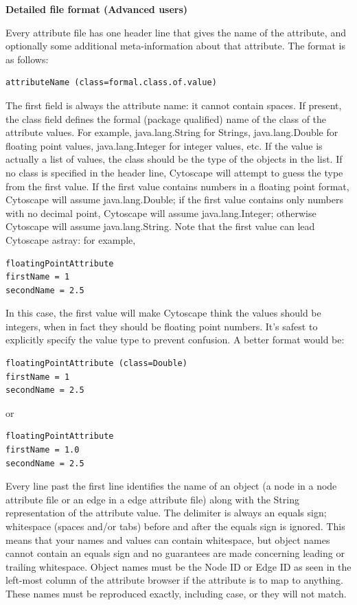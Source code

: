  \textbf{Detailed file format (Advanced users)}

 Every attribute file has one header line that gives the name of the attribute,
and optionally some additional meta-information about that attribute. The
format is as follows: 

 \begin{verbatim}
attributeName (class=formal.class.of.value)
\end{verbatim}

 The first field is always the attribute name: it cannot contain spaces. If
present, the class field defines the formal (package qualified) name of the
class of the attribute values. For example, java.lang.String for Strings,
java.lang.Double for floating point values, java.lang.Integer for integer
values, etc. If the value is actually a list of values, the class should be the
type of the objects in the list. If no class is specified in the header line,
Cytoscape will attempt to guess the type from the first value. If the first
value contains numbers in a floating point format, Cytoscape will assume
java.lang.Double; if the first value contains only numbers with no decimal
point, Cytoscape will assume java.lang.Integer; otherwise Cytoscape will assume
java.lang.String. Note that the first value can lead Cytoscape astray: for
example, 

 \begin{verbatim}
floatingPointAttribute
firstName = 1
secondName = 2.5
\end{verbatim}

 In this case, the first value will make Cytoscape think the values should be
integers, when in fact they should be floating point numbers. It's safest to
explicitly specify the value type to prevent confusion. A better format would
be: 


 \begin{verbatim}
floatingPointAttribute (class=Double)
firstName = 1
secondName = 2.5
\end{verbatim}

 or 

 \begin{verbatim}
floatingPointAttribute 
firstName = 1.0
secondName = 2.5
\end{verbatim}

 Every line past the first line identifies the name of an object (a node in a
node attribute file or an edge in a edge attribute file) along with the String
representation of the attribute value. The delimiter is always an equals sign;
whitespace (spaces and/or tabs) before and after the equals sign is ignored.
This means that your names and values can contain whitespace, but object names
cannot contain an equals sign and no guarantees are made concerning leading or
trailing whitespace. Object names must be the Node ID or Edge ID as seen in the
left-most column of the attribute browser if the attribute is to map to
anything. These names must be reproduced exactly, including case, or they will
not match. 


